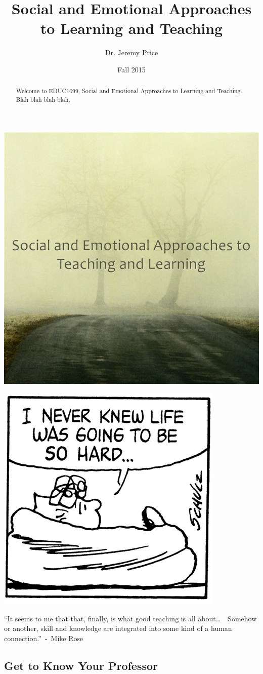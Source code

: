 \documentclass{tufte-handout}
\title{Social and Emotional Approaches to Learning and Teaching}
\author{Dr. Jeremy Price}
\date{Fall 2015}  %
\begin{document}
\maketitle%

\begin{abstract}
Welcome to EDUC1099, Social and Emotional Approaches to Learning and Teaching. Blah blah blah blah.\end{abstract}

\bigskip

\begin{fullwidth}
	\begin{center}
		\includegraphics[width=0.40\linewidth]{sealt-logo.jpg}

		\includegraphics[width=0.40\linewidth]{life-hard.png}

		\bigskip

		\Large
		\enquote{It seems to me that that, finally, is what good teaching is all about\ldots~~Somehow or another, skill and knowledge are integrated into some kind of a human connection.}~-~Mike Rose
		\normalsize
	\end{center}
\end{fullwidth}

\vfill

\subsection{Get to Know Your Professor}
\end{document}
